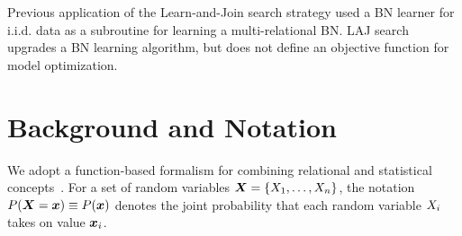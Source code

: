 \documentclass{article}
\begin{document}
Previous application of the Learn-and-Join search strategy \cite{Schulte2012} used a BN learner for i.i.d. data as a subroutine for learning a multi-relational BN. 
LAJ search upgrades a BN learning algorithm, but does not define an %
objective function for model optimization. 



\section{Background and Notation} 
We adopt  
 a function-based  formalism for combining relational and statistical concepts~\cite{Poole2003,Russell2015}. %
For a set of random variables $\boldsymbol{X} = \{X_{1},\ldots,X_{n}\}$, 
the  notation $P(\boldsymbol{X} = \boldsymbol{x}) \equiv P(\boldsymbol{x})$ denotes the joint probability that each random variable $X_{i}$ takes on value $\boldsymbol{x}_{i}$. 
\end{document}

